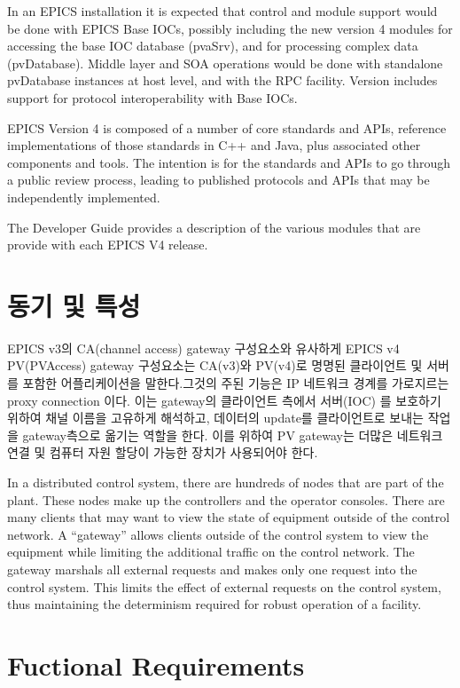 \documentclass[11pt
  , a4paper
  , article
  , oneside
]{memoir}
\begin{document}
In an EPICS installation it is expected that control and module support would be done with EPICS Base IOCs, possibly including the new version 4 modules for accessing the base IOC database (pvaSrv), and for processing complex data (pvDatabase). Middle layer and SOA operations would be done with standalone pvDatabase instances at host level, and with the RPC facility. Version includes support for protocol interoperability with Base IOCs.

EPICS Version 4 is composed of a number of core standards and APIs, reference implementations of those standards in C++ and Java, plus associated other components and tools. The intention is for the standards and APIs to go through a public review process, leading to published protocols and APIs that may be independently implemented.

The Developer Guide provides a description of the various modules that are provide with each EPICS V4 release.


\section{동기 및 특성}
EPICS v3의 CA(channel access) gateway 구성요소와 유사하게 EPICS v4 PV(PVAccess) gateway 구성요소는 CA(v3)와 PV(v4)로 명명된 클라이언트 및 서버를 포함한 어플리케이션을 말한다.그것의 주된 기능은 IP 네트워크 경계를 가로지르는 proxy connection 이다. 이는 gateway의 클라이언트 측에서 서버(IOC) 를 보호하기 위하여 채널 이름을 고유하게 해석하고, 데이터의 update를 클라이언트로 보내는 작업을 gateway측으로 옮기는 역할을 한다. 이를 위하여 PV gateway는 더많은 네트워크 연결 및 컴퓨터 자원 할당이 가능한 장치가 사용되어야 한다. 

In a distributed control system, there are hundreds of nodes that are part of the
plant. These nodes make up the controllers and the operator consoles. There
are many clients that may want to view the state of equipment outside of the
control network. A “gateway” allows clients outside of the control system to
view the equipment while limiting the additional traffic on the control network.
The gateway marshals all external requests and makes only one request into the
control system. This limits the effect of external requests on the control system,
thus maintaining the determinism required for robust operation of a facility.

\section{Fuctional Requirements}
\end{document}
